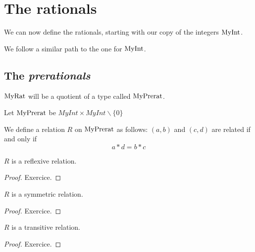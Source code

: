 \chapter{The rationals}

We can now define the rationals, starting with our copy of the integers $\mathrm{MyInt}$.

We follow a similar path to the one for $\mathrm{MyInt}$.

\section{The \emph{prerationals}}

$\mathrm{MyRat}$ will be a quotient of a type called $\mathrm{MyPrerat}$.

\begin{definition}
    \label{MyPrerat}
    \leanok
    Let $\mathrm{MyPrerat}$ be $MyInt \times MyInt \backslash \{0\}$
\end{definition}

\begin{definition}
    \label{MyPrerat.R}
    \leanok
We define a relation $R$ on $\mathrm{MyPrerat}$ as follows: $(a,b)$ and $(c, d)$ are related if and only if
\[
a * d = b * c
\]
\end{definition}

\begin{lemma}
$R$ is a reflexive relation.
    \label{MyPrerat.R_refl}
    \leanok
\end{lemma}
\begin{proof}
    \leanok
    Exercice.
\end{proof}

\begin{lemma}
$R$ is a symmetric relation.
    \label{MyPrerat.R_symm}
    \leanok
\end{lemma}
\begin{proof}
    \leanok
    Exercice.
\end{proof}

\begin{lemma}
$R$ is a transitive relation.
    \label{MyPrerat.R_trans}
    \leanok
\end{lemma}
\begin{proof}
    \leanok
    Exercice.
\end{proof}

